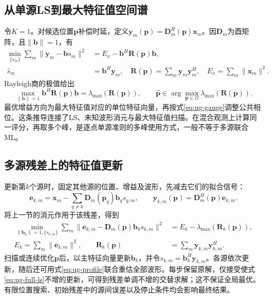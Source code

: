 \subsection{从单源LS到最大特征值空间谱}\label{sec:ug-single}
令$K=1$。对候选位置$\mathbf p$补偿时延，定义$\mathbf y_m(\mathbf p)=\mathbf D_m^H(\mathbf p)\mathbf x_m$。因$\mathbf D_m$为酉矩阵，且$\|\mathbf b\|=1$，有
\begin{equation}\label{eq:ug-single-elimination}
\begin{aligned}
\min_{\{s_m\}}\sum_m\|\mathbf y_m-\mathbf b s_m\|^2
&=E_x-\mathbf b^H\mathbf R(\mathbf p)\mathbf b,\\
\widehat s_m&=\mathbf b^H\mathbf y_m,\quad
\mathbf R(\mathbf p)=\sum_m\mathbf y_m\mathbf y_m^H,\quad
E_x=\sum_m\|\mathbf x_m\|^2.
\end{aligned}
\end{equation}
Rayleigh商的极值给出
\begin{equation}\label{eq:ug-single-eigen}
\max_{\|\mathbf b\|=1}\mathbf b^H\mathbf R(\mathbf p)\mathbf b
=\lambda_{\max}(\mathbf R(\mathbf p)),\qquad
\widehat{\mathbf p}\in\arg\max_{\mathbf p\in\Omega}
\lambda_{\max}(\mathbf R(\mathbf p)).
\end{equation}
最优增益方向为最大特征值对应的单位特征向量，再按式\eqref{eq:ug-gauge}调整公共相位。这条推导连接了LS、未知波形消元与最大特征值扫描\cite{ref05,ref06}。在混合观测上计算同一评分，再取多个峰，是逐点单源准则的多峰使用方式，一般不等于多源联合ML。

\subsection{多源残差上的特征值更新}\label{sec:ug-block}
更新第$k$个源时，固定其他源的位置、增益及波形，先减去它们的拟合信号：
\begin{equation}\label{eq:ug-residual}
\mathbf e_{k,m}=\mathbf x_m-
\sum_{q\ne k}\mathbf D_m(\mathbf p_q)\mathbf b_qs_{q,m},\qquad
\mathbf y_{k,m}(\mathbf p)=\mathbf D_m^H(\mathbf p)\mathbf e_{k,m}.
\end{equation}
将上一节的消元作用于该残差，得到
\begin{equation}\label{eq:ug-block-eigen}
\begin{aligned}
\min_{\|\mathbf b_k\|=1,\{s_{k,m}\}}
\sum_m\|\mathbf e_{k,m}-\mathbf D_m(\mathbf p)\mathbf b_ks_{k,m}\|^2
&=E_k-\lambda_{\max}(\mathbf R_k(\mathbf p)),\\
E_k=\sum_m\|\mathbf e_{k,m}\|^2,\qquad
\mathbf R_k(\mathbf p)&=\sum_m\mathbf y_{k,m}\mathbf y_{k,m}^H.
\end{aligned}
\end{equation}
扫描或连续优化$\mathbf p$后，以主特征向量更新$\mathbf b_k$，并令$s_{k,m}=\mathbf b_k^H\mathbf y_{k,m}$。各源依次更新，随后还可用式\eqref{eq:ug-profile}联合重估全部波形。每步保留原解，仅接受使式\eqref{eq:ug-full-ls}不增的更新，可得到残差单调不增的交替求解；这不保证全局最优。有限位置搜索、初始残差中的源间误差以及停止条件均会影响最终结果。

